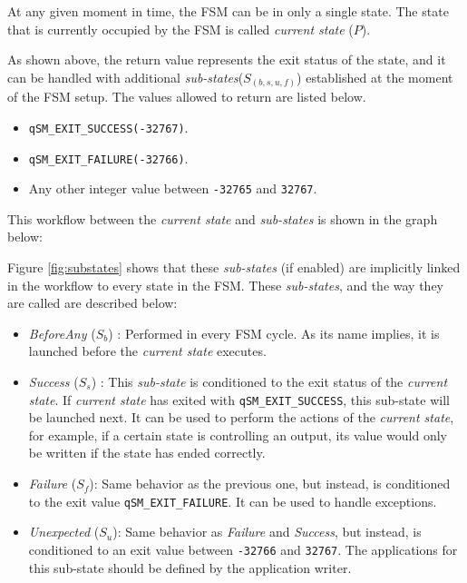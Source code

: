 At any given moment in time, the FSM can be in only a single state. The state that is currently occupied by the FSM is called \textit{current state} ($P$).

As shown above, the return value represents the exit status of the state, and it can be handled with additional \textit{sub-states}($S_{(b,s,u,f)}$) established at the moment of the FSM setup. The values allowed to return are listed below.

\begin{itemize}
    \item \lstinline{qSM_EXIT_SUCCESS(-32767)}.
    \item \lstinline{qSM_EXIT_FAILURE(-32766)}.
    \item Any other integer value between \lstinline{-32765} and \lstinline{32767}.
\end{itemize} 

This workflow between the \textit{current state} and \textit{sub-states} is shown in the graph below: 


Figure \ref{fig:substates} shows that these \textit{sub-states} (if enabled) are implicitly linked in the workflow to every state in the FSM. These \textit{sub-states}, and the way they are called are described below:

\begin{itemize}
    \item \textit{BeforeAny} ($S_b$) : Performed in every FSM cycle. As its name implies, it is launched before the \textit{current state} executes. 
    
    \item \textit{Success} ($S_s$) : This \textit{sub-state} is conditioned to the exit status of the \textit{current state}. If \textit{current state} has exited with  \lstinline{qSM_EXIT_SUCCESS}, this sub-state will be launched next. It can be used to perform the actions of the \textit{current state}, for example, if a certain state is controlling an output, its value would only be written if the state has ended correctly.
    
    \item \textit{Failure} ($S_f$): Same behavior as the previous one, but instead, is conditioned to the exit value \lstinline{qSM_EXIT_FAILURE}. It can be used to handle exceptions.
    
    \item \textit{Unexpected} ($S_u$): Same behavior as \textit{Failure} and \textit{Success}, but instead, is conditioned to an exit value between \lstinline{-32766} and \lstinline{32767}. The applications for this sub-state should be defined by the application writer.
\end{itemize}


